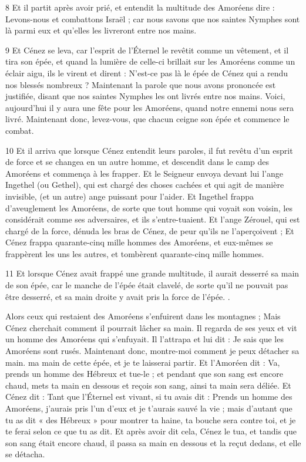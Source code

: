 \par 8 Et il partit après avoir prié, et entendit la multitude des Amoréens dire : Levons-nous et combattons Israël ; car nous savons que nos saintes Nymphes sont là parmi eux et qu'elles les livreront entre nos mains.

\par 9 Et Cénez se leva, car l'esprit de l'Éternel le revêtit comme un vêtement, et il tira son épée, et quand la lumière de celle-ci brillait sur les Amoréens comme un éclair aigu, ils le virent et dirent : N'est-ce pas là le épée de Cénez qui a rendu nos blessés nombreux ? Maintenant la parole que nous avons prononcée est justifiée, disant que nos saintes Nymphes les ont livrés entre nos mains. Voici, aujourd'hui il y aura une fête pour les Amoréens, quand notre ennemi nous sera livré. Maintenant donc, levez-vous, que chacun ceigne son épée et commence le combat.

\par 10 Et il arriva que lorsque Cénez entendit leurs paroles, il fut revêtu d'un esprit de force et se changea en un autre homme, et descendit dans le camp des Amoréens et commença à les frapper. Et le Seigneur envoya devant lui l'ange Ingethel (ou Gethel), qui est chargé des choses cachées et qui agit de manière invisible, (et un autre) ange puissant pour l'aider. Et Ingethel frappa d'aveuglement les Amoréens, de sorte que tout homme qui voyait son voisin, les considérait comme ses adversaires, et ils s'entre-tuaient. Et l'ange Zérouel, qui est chargé de la force, dénuda les bras de Cénez, de peur qu'ils ne l'aperçoivent ; Et Cénez frappa quarante-cinq mille hommes des Amoréens, et eux-mêmes se frappèrent les uns les autres, et tombèrent quarante-cinq mille hommes.

\par 11 Et lorsque Cénez avait frappé une grande multitude, il aurait desserré sa main de son épée, car le manche de l'épée était clavelé, de sorte qu'il ne pouvait pas être desserré, et sa main droite y avait pris la force de l'épée. .

\par Alors ceux qui restaient des Amoréens s'enfuirent dans les montagnes ; Mais Cénez cherchait comment il pourrait lâcher sa main. Il regarda de ses yeux et vit un homme des Amoréens qui s'enfuyait. Il l'attrapa et lui dit : Je sais que les Amoréens sont rusés. Maintenant donc, montre-moi comment je peux détacher sa main. ma main de cette épée, et je te laisserai partir. Et l'Amoréen dit : Va, prends un homme des Hébreux et tue-le ; et pendant que son sang est encore chaud, mets ta main en dessous et reçois son sang, ainsi ta main sera déliée. Et Cénez dit : Tant que l'Éternel est vivant, si tu avais dit : Prends un homme des Amoréens, j'aurais pris l'un d'eux et je t'aurais sauvé la vie ; mais d'autant que tu as dit « des Hébreux » pour montrer ta haine, ta bouche sera contre toi, et je te ferai selon ce que tu as dit. Et après avoir dit cela, Cénez le tua, et tandis que son sang était encore chaud, il passa sa main en dessous et la reçut dedans, et elle se détacha.

